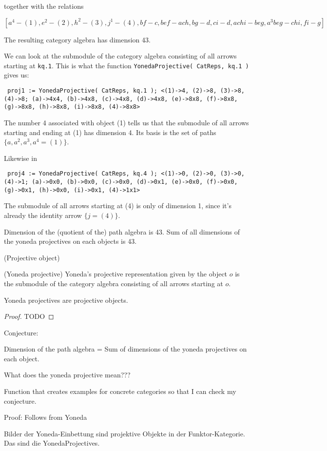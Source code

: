 together with the relations

\[
[a^{4} - (1), e^{2} - (2), h^{2} - (3), j^{1} - (4), bf - c, bef-ach, bg-d, ci-d, achi-beg, a^{3}beg-chi, fi-g]
\]

The resulting category algebra has dimension 43.

We can look at the submodule of the category algebra consisting of all arrows starting at \texttt{kq.1}.
This is what the function \texttt{YonedaProjective( CatReps, kq.1 )} gives us:

\texttt{
proj1 := YonedaProjective( CatReps, kq.1 );
<(1)->4, (2)->8, (3)->8, (4)->8; (a)->4x4, (b)->4x8, (c)->4x8,
(d)->4x8, (e)->8x8, (f)->8x8, (g)->8x8, (h)->8x8, (i)->8x8, (4)->8x8>
}

The number 4 associated with object (1) tells us that the submodule of all arrows starting and ending at (1) has dimension 4.
Its basis is the set of paths $\{a, a^{2}, a^{3}, a^{4} = (1) \}$.

Likewise in

\texttt{
proj4 := YonedaProjective( CatReps, kq.4 );
<(1)->0, (2)->0, (3)->0, (4)->1; (a)->0x0, (b)->0x0, (c)->0x0,
(d)->0x1, (e)->0x0, (f)->0x0, (g)->0x1, (h)->0x0, (i)->0x1, (4)->1x1>
}

The submodule of all arrows starting at (4) is only of dimension 1, since it's already the identity arrow $\{j = (4)\}$.

Dimension of the (quotient of the) path algebra is 43.
Sum of all dimensions of the yoneda projectives on each objects is 43.

\begin{definition}{(Projective object)}

\end{definition}

\begin{definition}{(Yoneda projective)}
Yoneda's projective representation given by the object $o$ is the submodule of the category algebra
consisting of all arrows starting at $o$.
\end{definition}

\begin{theorem}
Yoneda projectives are projective objects.
\begin{proof}
TODO
\end{proof}
\end{theorem}

Conjecture: 

Dimension of the path algebra = Sum of dimensions of the yoneda projectives on each object.

What does the yoneda projective mean???

Function that creates examples for concrete categories so that I can check my conjecture.

Proof: Follows from Yoneda

Bilder der Yoneda-Einbettung sind projektive Objekte in der Funktor-Kategorie. Das sind die YonedaProjectives.